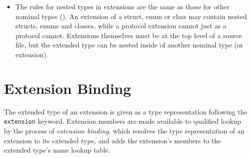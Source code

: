 \documentclass[../generics]{subfiles}
\begin{document}
\begin{itemize}
\item The rules for nested types in extensions are the same as those for other nominal types (). An extension of a struct, enum or class may contain nested structs, enums and classes, while a protocol extension cannot just as a protocol cannot. Extensions themselves must be at the top level of a source file, but the extended type can be nested inside of another nominal type (or extension).
\end{itemize}

\section{Extension Binding}\label{extension binding}

The extended type of an extension is given as a type representation following the \texttt{extension} keyword. Extension members are made available to qualified lookup by the process of \emph{extension binding}, which resolves the type representation of an extension to its extended type, and adds the extension's members to the extended type's name lookup table.
\end{document}
